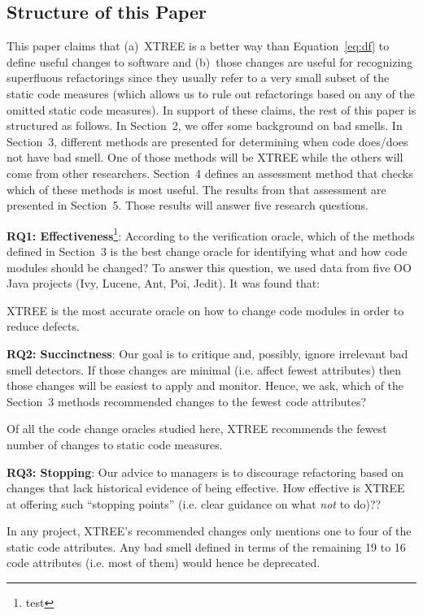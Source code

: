 \documentclass[twocolumn,5p]{elsarticle}
\newcommand{\eq}[1]{Equation~\ref{eq:#1}}
\theoremstyle{break}
\begin{document}
	\subsection{Structure of this Paper}
	
	This paper  claims that (a)~XTREE is a  better way than \eq{df}  to define useful changes to software and (b)~those changes are useful for recognizing   superfluous refactorings since they usually refer to a very 
	small subset of the static code measures (which allows us to rule out refactorings based on any of the omitted
	static code measures). 
	In support of these claims, 
	the rest of this paper is structured as follows. In Section~2, we offer some background on bad smells. In Section~3, 
	different methods are presented for determining when code does/does not have bad smell. One of those methods
	will be XTREE while the others will come from other researchers. Section~4
	defines an assessment method that checks which of these methods is most useful. The results from that assessment 
	are presented in Section~5. Those results will answer five research questions.
	
	{\bf  RQ1: Effectiveness}\footnote{test}: According to the verification oracle, which of the methods  defined in Section~3 is the best  change oracle for identifying what and how
	code modules should be changed? To answer this question, we used data from five OO Java projects
	(Ivy, Lucene, Ant, Poi, Jedit). It was found that:
	\begin{lesson}
		XTREE is the most accurate oracle on how to change code modules in order to reduce defects.
	\end{lesson}
	
	{\bf RQ2: Succinctness}: Our goal is to critique and, possibly,
	ignore irrelevant bad smell detectors.  If those changes are minimal (i.e. affect fewest attributes) then those changes
	will be easiest to apply and monitor. Hence, we ask, which of the Section~3 methods recommended changes to the fewest
	code attributes?
	\begin{lesson}
		Of all the code change oracles studied here, XTREE recommends the fewest number of changes to static code measures.
	\end{lesson}
	
	{\bf RQ3: Stopping}: Our advice to managers is to discourage refactoring based on changes that lack
	historical evidence of being effective. How effective is XTREE at offering such ``stopping points'' (i.e. clear guidance on what {\em not} to do)??
	\begin{lesson}
		In  any  project,  XTREE's  recommended  changes  only  mentions one to four 
		of the  static code attributes.  Any bad smell defined in terms of the remaining 19 to 16 code attributes (i.e. most of them)
		would hence be deprecated.
	\end{lesson}
	
\end{document}

